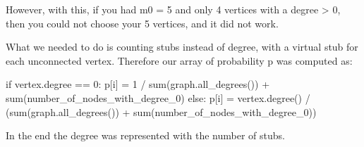 \documentclass{article}
\begin{document}
However, with this, if you had m0 = 5 and only 4 vertices with a degree > 0,
then you could not choose your 5 vertices, and it did not work.

What we needed to do is counting stubs instead of degree, with a virtual stub
for each unconnected vertex. Therefore our array of probability p was computed
as:

\begin{python}
if vertex.degree == 0:
    p[i] = 1 / sum(graph.all_degrees()) + sum(number_of_nodes_with_degree_0)
else:
    p[i] = vertex.degree() / (sum(graph.all_degrees()) + sum(number_of_nodes_with_degree_0))
\end{python}

In the end the degree was represented with the number of stubs.
\end{document}
